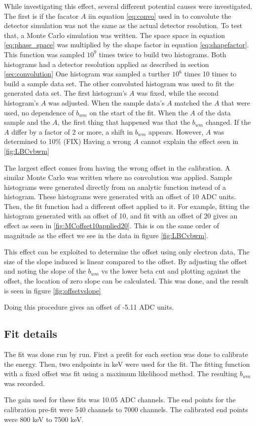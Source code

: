 While investigating this effect, several different potential causes were investigated.
The first is if the facator $A$ iin equation \ref{eq:convo} used in to convolute the detector simulation was not the same as the actual detector resolution.
To test that, a Monte Carlo simulation was written.
The space space in equation \ref{eq:phase_space} was multiplied by the shape factor in equation \ref{eq:shapefactor}.
This function was sampled $10^{9}$ times twice to build two histograms. 
Both histograms had a detector resolution applied as described in section \ref{sec:convolution}
One histogram was sampled a turther $10^{6}$ times 10 times to build a sample data set.
The other convoluted histogram was used to fit the generated data set.
The first histogram's $A$ was fixed, while the second histogram's $A$ was adjusted.
When the sample data's $A$ matched the $A$ that were used, no dependence of $b_{wm}$ on the start of the fit.
When the $A$ of the data sample and the $A$, the first thing that happened was that the $b_{wm}$ changed.
If the $A$ differ by a factor of 2 or more, a shift in $b_{wm}$ appears.
However, $A$ was determined to 10\% (FIX)
Having a wrong $A$ cannot explain the effect seen in \ref{fig:LBCvbwm}

The largest effect comes from having the wrong offset in the calibration.
A similar Monte Carlo was written where no convolution was applied.
Sample histograms were generated directly from an analytic function instead of a histogram.
These histograms were generated with an offset of 10 ADC units.
Then, the fit function had a different offset applied to it.
For example, fitting the histogram generated with an offset of 10, and fit with an offset of 20 gives an effect as seen in \ref{fig:MCoffset10applied20}.
This is on the same order of magnitude as the effect we see in the data in figure \ref{fig:LBCvbwm}.

This effect can be exploited to determine the offset using only electron data, 
The size of the slope induced is linear compared to the offset.
By adjusting the offset and noting the slope of the $b_{wm}$ vs the lower beta cut and plotting against the offset, the location of zero slope can be calculated.
This was done, and the result is seen in figure \ref{fig:offsetvslope} 

Doing this procedure gives an offset of -5.11 ADC units. 

\subsection{Fit details}
The fit was done run by run.
First a prefit for each section was done to calibrate the energy.
Then, two endpoints in keV were used for the fit.
The fitting function with a fixed offset was fit using a maximum likelihood method.
The resulting $b_{wm}$ was recorded.

The gain used for these fits was 10.05 ADC channels.
The end points for the calibration pre-fit were 540 channels to 7000 channels.
The calibrated end points were 800 keV to 7500 keV. 
 
